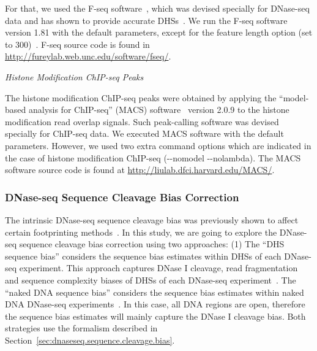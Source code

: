 For that, we used the F-seq software~\citep{boyle2008b}, which was devised specially for DNase-seq data and has shown to provide accurate DHSs~\citep{boyle2008b,boyle2011}. We run the F-seq software version 1.81 with the default parameters, except for the feature length option (set to $300$)~\citep{boyle2011}. F-seq source code is found in \url{http://fureylab.web.unc.edu/software/fseq/}.

\vspace{0.5cm}
\noindent
\emph{Histone Modification ChIP-seq Peaks}
\vspace{0.3cm}

\noindent
The histone modification ChIP-seq peaks were obtained by applying the ``model-based analysis for ChIP-seq'' (MACS) software~\citep{zhang2008} version 2.0.9 to the histone modification read overlap signals. Such peak-calling software was devised specially for ChIP-seq data. We executed MACS software with the default parameters. However, we used two extra command options which are indicated in the case of histone modification ChIP-seq (-{}-nomodel -{}-nolambda). The MACS software source code is found at \url{http://liulab.dfci.harvard.edu/MACS/}.

\subsubsection{DNase-seq Sequence Cleavage Bias Correction}

The intrinsic DNase-seq sequence cleavage bias was previously shown to affect certain footprinting methods~\citep{he2014}. In this study, we are going to explore the DNase-seq sequence cleavage bias correction using two approaches: (1) The ``DHS sequence bias'' considers the sequence bias estimates within DHSs of each DNase-seq experiment. This approach captures DNase I cleavage, read fragmentation and sequence complexity biases of DHSs of each DNase-seq experiment~\citep{he2014}. The ``naked DNA sequence bias'' considers the sequence bias estimates within naked DNA DNase-seq experiments~\citep{yardimci2014}. In this case, all DNA regions are open, therefore the sequence bias estimates will mainly capture the DNase I cleavage bias. Both strategies use the formalism described in Section~\ref{sec:dnaseseq.sequence.cleavage.bias}.

